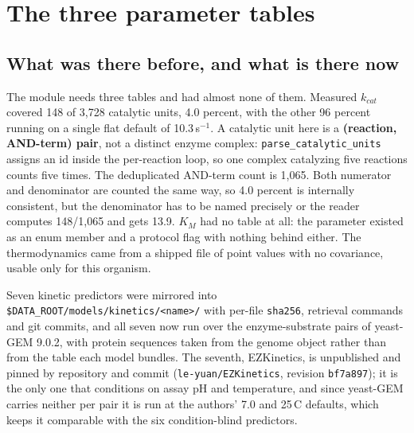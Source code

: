 
\section{The three parameter tables}
\label{sec:parameters}

\subsection{What was there before, and what is there now}

The module needs three tables and had almost none of them. Measured $k_{cat}$ covered 148
of 3{,}728 catalytic units, 4.0 percent, with the other 96 percent running on a single flat
default of 10.3\,s$^{-1}$. A catalytic unit here is a \textbf{(reaction, AND-term) pair},
not a distinct enzyme complex: \texttt{parse\_catalytic\_units} assigns an id inside the
per-reaction loop, so one complex catalyzing five reactions counts five times. The
deduplicated AND-term count is 1{,}065. Both numerator and denominator are counted the same
way, so 4.0 percent is internally consistent, but the denominator has to be named precisely
or the reader computes 148/1{,}065 and gets 13.9. $K_M$ had no table at all: the parameter existed as an enum
member and a protocol flag with nothing behind either. The thermodynamics came from a
shipped file of point values with no covariance, usable only for this organism.

Seven kinetic predictors were mirrored into
\texttt{\$DATA\_ROOT/models/kinetics/<name>/} with per-file \texttt{sha256}, retrieval
commands and git commits, and all seven now run over the enzyme-substrate pairs of yeast-GEM
9.0.2, with protein sequences taken from the genome object rather than from the table each
model bundles. The seventh, EZKinetics, is unpublished and pinned by repository and commit
(\texttt{le-yuan/EZKinetics}, revision \texttt{bf7a897}); it is the only one that
conditions on assay pH and temperature, and since yeast-GEM carries neither per pair it is
run at the authors' 7.0 and 25\,\textdegree C defaults, which keeps it comparable with the
six condition-blind predictors.


